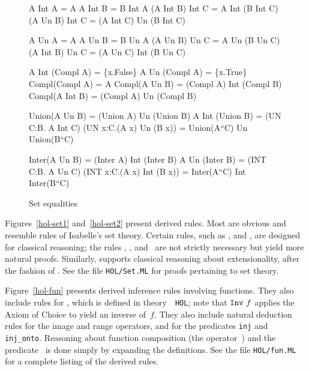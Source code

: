 \begin{figure} \underscoreon   \hfuzz=4pt%
\begin{ttbox}
        A Int A = A
       A Int B = B Int A
         (A Int B) Int C  =  A Int (B Int C)
    (A Un B)  Int C  =  (A Int C) Un (B Int C)

         A Un A = A
        A Un B = B Un A
          (A Un B)  Un C  =  A Un (B Un C)
    (A Int B) Un C  =  (A Un C) Int (B Un C)

    A Int (Compl A) = \{x.False\}
   A Un  (Compl A) = \{x.True\}
 Compl(Compl A) = A
          Compl(A Un B)  = (Compl A) Int (Compl B)
         Compl(A Int B) = (Compl A) Un (Compl B)

  Union(A Un B) = (Union A) Un (Union B)
         A Int (Union B) = (UN C:B. A Int C)
    (UN x:C.(A x) Un (B x)) = Union(A``C) Un Union(B``C)

  Inter(A Un B) = (Inter A) Int (Inter B)
          A Un (Inter B) = (INT C:B. A Un C)
   (INT x:C.(A x) Int (B x)) = Inter(A``C) Int Inter(B``C)
\end{ttbox}
\caption{Set equalities} \label{hol-equalities}
\end{figure}


Figures~\ref{hol-set1} and~\ref{hol-set2} present derived rules.  Most are
obvious and resemble rules of Isabelle's {\ZF} set theory.  Certain rules,
such as ,  and ,
are designed for classical reasoning; the rules ,
,  and~ are not
strictly necessary but yield more natural proofs.  Similarly,
 supports classical reasoning about extensionality,
after the fashion of .  See the file {\tt HOL/Set.ML} for
proofs pertaining to set theory.

Figure~\ref{hol-fun} presents derived inference rules involving functions.
They also include rules for , which is defined in theory~{\tt
  HOL}; note that ${\tt Inv}~f$ applies the Axiom of Choice to yield an
inverse of~$f$.  They also include natural deduction rules for the image
and range operators, and for the predicates {\tt inj} and {\tt inj_onto}.
Reasoning about function composition (the operator~) and the
predicate~ is done simply by expanding the definitions.  See
the file {\tt HOL/fun.ML} for a complete listing of the derived rules.

